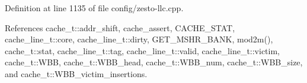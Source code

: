 Definition at line 1135 of file config/zesto-llc.cpp.

References cache\_\-t::addr\_\-shift, cache\_\-assert, CACHE\_\-STAT, cache\_\-line\_\-t::core, cache\_\-line\_\-t::dirty, GET\_\-MSHR\_\-BANK, mod2m(), cache\_\-t::stat, cache\_\-line\_\-t::tag, cache\_\-line\_\-t::valid, cache\_\-line\_\-t::victim, cache\_\-t::WBB, cache\_\-t::WBB\_\-head, cache\_\-t::WBB\_\-num, cache\_\-t::WBB\_\-size, and cache\_\-t::WBB\_\-victim\_\-insertions.